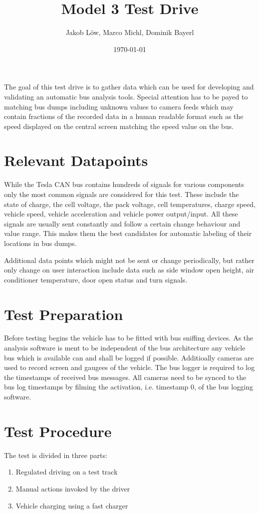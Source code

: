 \documentclass[11pt]{article}
\title{\textbf{Model 3 Test Drive}}
\author{Jakob Löw, Marco Michl, Dominik Bayerl}
\date{\today}
\begin{document}
\maketitle

The goal of this test drive is to gather data which can be used for developing and validating an automatic bus analysis tools. Special attention has to be payed to matching bus dumps including unknown values to camera feeds which may contain fractions of the recorded data in a human readable format such as the speed displayed on the central screen matching the speed value on the bus.

\section{Relevant Datapoints}

While the Tesla CAN bus contains hundreds of signals for various components only the most common signals are considered for this test. These include the state of charge, the cell voltage, the pack voltage, cell temperatures, charge speed, vehicle speed, vehicle acceleration and vehicle power output/input.
All these signals are usually sent constantly and follow a certain change behaviour and value range. This makes them the best candidates for automatic labeling of their locations in bus dumps.

Additional data points which might not be sent or change periodically, but rather only change on user interaction include data such as side window open height, air conditioner temperature, door open status and turn signals.

\section{Test Preparation}
Before testing begins the vehicle has to be fitted with bus sniffing devices. As the analysis software is ment to be independent of the bus architecture any vehicle bus which is available can and shall be logged if possible. Additioally cameras are used to record screen and gaugees of the vehicle. The bus logger is required to log the timestamps of received bus messages. All cameras need to be synced to the bus log timestamps by filming the activation, i.e. timestamp 0, of the bus logging software.

\section{Test Procedure}
The test is divided in three parts:
\begin{enumerate}
\item Regulated driving on a test track
\item Manual actions invoked by the driver
\item Vehicle charging using a fast charger
\end{enumerate}
\end{document}
